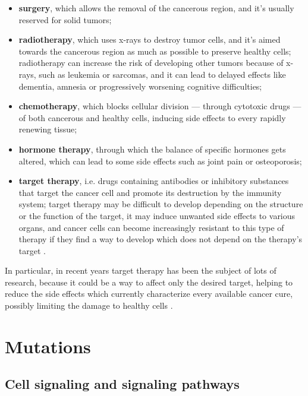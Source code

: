 \begin{itemize}
    \item \textbf{surgery}, which allows the removal of the cancerous region, and it's usually reserved for solid tumors;
    \item \textbf{radiotherapy}, which uses x-rays to destroy tumor cells, and it's aimed towards the cancerous region as much as possible to preserve healthy cells; radiotherapy can increase the risk of developing other tumors because of x-rays, such as leukemia or sarcomas, and it can lead to delayed effects like dementia, amnesia or progressively worsening cognitive difficulties;
    \item \textbf{chemotherapy}, which blocks cellular division --- through cytotoxic drugs --- of both cancerous and healthy cells, inducing side effects to every rapidly renewing tissue;
    \item \textbf{hormone therapy}, through which the balance of specific hormones gets altered, which can lead to some side effects such as joint pain or osteoporosis;
    \item \textbf{target therapy}, i.e. drugs containing antibodies or inhibitory substances that target the cancer cell and promote its destruction by the immunity system; target therapy may be difficult to develop depending on the structure or the function of the target, it may induce unwanted side effects to various organs, and cancer cells can become increasingly resistant to this type of therapy if they find a way to develop which does not depend on the therapy's target \cite{target_therapy1} .
\end{itemize}

In particular, in recent years target therapy has been the subject of lots of research, because it could be a way to affect only the desired target, helping to reduce the side effects which currently characterize every available cancer cure, possibly limiting the damage to healthy cells \cite{target_therapy3}. 

\section{Mutations}

\subsection{Cell signaling and signaling pathways}


